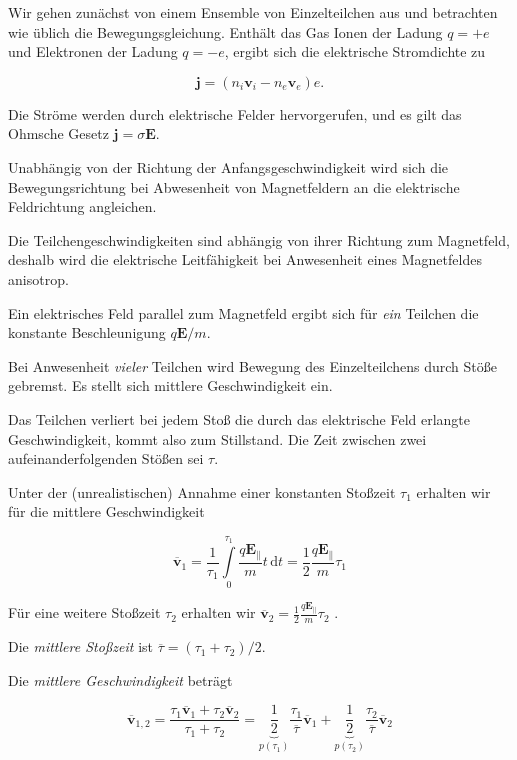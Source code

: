 \documentclass[
  a4paper,
  DIV=11]{scrreprt}
\begin{document}
Wir gehen zunächst von einem Ensemble von Einzelteilchen aus und
betrachten wie üblich die Bewegungsgleichung. Enthält das Gas Ionen der
Ladung \(q=+e\) und Elektronen der Ladung \(q=-e\), ergibt sich die
elektrische Stromdichte zu

\[
\mathbf j = (n_i \mathbf v_i - n_e \mathbf v_e) e.
\]

Die Ströme werden durch elektrische Felder hervorgerufen, und es gilt
das Ohmsche Gesetz \(\mathbf j = \sigma \mathbf E\).

Unabhängig von der Richtung der Anfangsgeschwindigkeit wird sich die
Bewegungsrichtung bei Abwesenheit von Magnetfeldern an die elektrische
Feldrichtung angleichen.

Die Teilchengeschwindigkeiten sind abhängig von ihrer Richtung zum
Magnetfeld, deshalb wird die elektrische Leitfähigkeit bei Anwesenheit
eines Magnetfeldes anisotrop.

Ein elektrisches Feld parallel zum Magnetfeld ergibt sich für \emph{ein}
Teilchen die konstante Beschleunigung \(q \mathbf E / m\).

Bei Anwesenheit \emph{vieler} Teilchen wird Bewegung des Einzelteilchens
durch Stöße gebremst. Es stellt sich mittlere Geschwindigkeit ein.

Das Teilchen verliert bei jedem Stoß die durch das elektrische Feld
erlangte Geschwindigkeit, kommt also zum Stillstand. Die Zeit zwischen
zwei aufeinanderfolgenden Stößen sei \(\tau\).

Unter der (unrealistischen) Annahme einer konstanten Stoßzeit \(\tau_1\)
erhalten wir für die mittlere Geschwindigkeit

\[
\overline{\mathbf v}_1 = \frac{1}{\tau_1}\int\limits_0^{\tau_1} \frac{q \mathbf E_\|}{m} t \,\mathrm d t =
\frac{1}{2} \frac{q \mathbf E_\|}{m} \tau_1
\]

Für eine weitere Stoßzeit \(\tau_2\) erhalten wir
\(\overline{\mathbf v}_2 = \frac{1}{2} \frac{q \mathbf E_\|}{m} \tau_2\)
.

Die \emph{mittlere Stoßzeit} ist
\(\overline\tau = (\tau_1 + \tau_2) / 2\).

Die \emph{mittlere Geschwindigkeit} beträgt

\[
\overline{\mathbf v}_{1,2} = \frac{\tau_1 \overline{\mathbf v}_1 + \tau_2 \overline{\mathbf v}_2}{\tau_1 + \tau_2} = \underbrace{\frac{1}{2}}_{p(\tau_1)} \frac{\tau_1}{\overline \tau}\overline{\mathbf v}_1 + 
\underbrace{\frac{1}{2}}_{p(\tau_2)} \frac{\tau_2}{\overline \tau}\overline{\mathbf v}_2
\]
\end{document}
